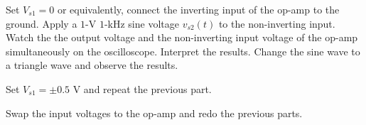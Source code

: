 \documentclass[11pt]{article}
\begin{document}
\begin{question}
\begin{subquestion}{Set $V_{s1}=0$ or equivalently, connect the inverting input of the op-amp to the ground. Apply a $1$-V $1$-kHz sine voltage $v_{s2}(t)$ to the non-inverting input. Watch the the output voltage and the non-inverting input voltage of the op-amp simultaneously on the oscilloscope. Interpret the results. Change the sine wave to a triangle wave and observe the results.} 
\answer{}
\end{subquestion}

\begin{subquestion}{Set $V_{s1}=\pm 0.5$ V and repeat the previous part.} 
\answer{}
\end{subquestion}

\begin{subquestion}{Swap the input voltages to the op-amp and redo the previous parts.} 
\answer{}
\end{subquestion}


\end{question}

\end{document}
